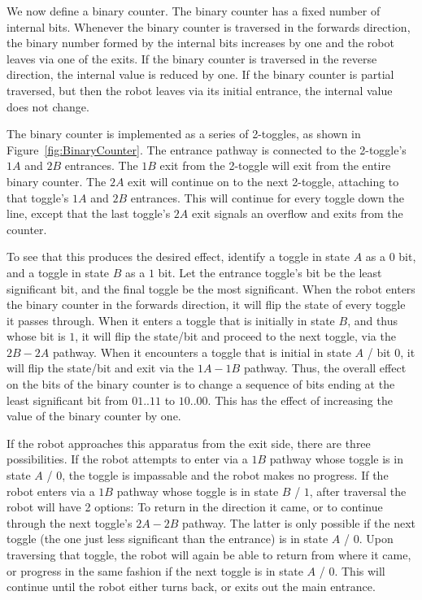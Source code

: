 We now define a binary counter. The binary counter has a fixed number of internal bits.
Whenever the binary counter is traversed in the forwards direction, the binary number
formed by the internal bits increases by one and the robot leaves via one of the exits.
If the binary counter is traversed in the reverse direction, the internal value is reduced by
one. If the binary counter is partial traversed, but then the robot leaves via its initial entrance,
the internal value does not change.

The binary counter is implemented as a series of 2-toggles, as shown in Figure~\ref{fig:BinaryCounter}.
The entrance pathway is connected to the 2-toggle's $1A$ and $2B$ entrances. The $1B$ exit from the 2-toggle
will exit from the entire binary counter. The $2A$ exit will continue on to the next 2-toggle,
attaching to that toggle's $1A$ and $2B$ entrances. This will continue for every toggle down the line, except
that the last toggle's $2A$ exit signals an overflow and exits from the counter.

To see that this produces the desired effect, identify a toggle in state $A$ as a $0$ bit, and a toggle in state
$B$ as a $1$ bit. Let the entrance toggle's bit be the least significant bit, and the final toggle be the
most significant. When the robot enters the binary counter in the forwards direction, it will flip
the state of every toggle it passes through. When it enters a toggle that is initially in state $B$, and thus whose
bit is $1$, it will flip the state/bit and proceed to the next toggle, via the $2B - 2A$ pathway. When it
encounters a toggle that is initial in state $A$ / bit $0$, it will flip the state/bit and exit via the $1A - 1B$
pathway. Thus, the overall effect on the bits of the binary counter is to change a sequence of bits ending at the
least significant bit from $01..11$ to $10..00$. This has the effect of increasing the value of the binary counter
by one.

If the robot approaches this apparatus from the exit side, there are three possibilities. If the robot attempts
to enter via a $1B$ pathway whose toggle is in state $A$ / $0$, the toggle is impassable and the robot makes
no progress. If the robot enters via a $1B$ pathway whose toggle is in state $B$ / $1$, after traversal the
robot will have 2 options: To return in the direction it came, or to continue through the next toggle's
$2A -2B$ pathway. The latter is only possible if the next toggle
(the one just less significant than the entrance) is
in state $A$ / $0$. Upon traversing that toggle, the robot will again be able to return from where it came, or
progress in the same fashion if the next toggle is in state $A$ / $0$. This will continue until the robot
either turns back, or exits out the main entrance.


